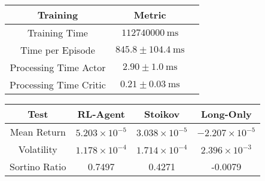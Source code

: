 \begin{table*}
    \centering
    \small

    \begin{tabular}{|c|c|c|}
        \hline
        \textbf{Training}      & \textbf{Metric}                       \\
        \hline
        Training Time          & $\SI{112740000}{\milli\second}$       \\
        Time per Episode       & $845.8 \pm \SI{104.4}{\milli\second}$ \\
        Processing Time Actor  & $2.90 \pm \SI{1.0}{\milli\second}$    \\
        Processing Time Critic & $0.21 \pm \SI{0.03}{\milli\second}$   \\
        \hline
    \end{tabular}
    \caption{Test Results}
    \label{tab:test-results}
    \centering
    \vspace{0.5cm}
    \small

    \begin{tabular}{|c|c|c|c|}
        \hline
        \textbf{Test} & \textbf{RL-Agent}      & \textbf{Stoikov}       & \textbf{Long-Only}      \\
        \hline
        Mean Return   & $5.203 \times 10^{-5}$ & $3.038 \times 10^{-5}$ & $-2.207 \times 10^{-5}$ \\
        Volatility    & $1.178 \times 10^{-4}$ & $1.714 \times 10^{-4}$ & $2.396 \times 10^{-3}$  \\
        Sortino Ratio & 0.7497                 & 0.4271                 & -0.0079                 \\
        \hline
    \end{tabular}
    \caption{Training Results}
    \label{tab:training-results}
\end{table*}

